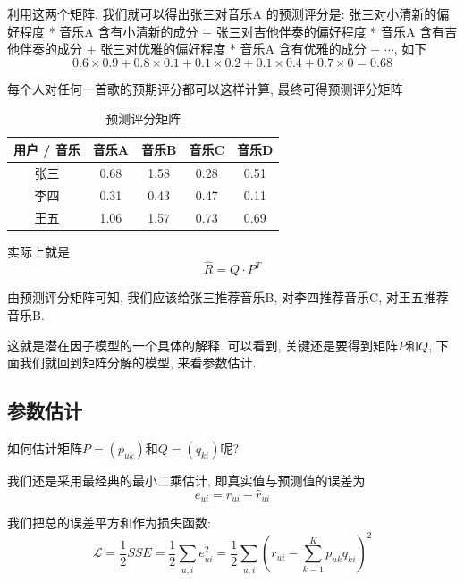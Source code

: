 \documentclass[a4paper,UTF8]{ctexart}
\theoremstyle{plain} \newtheorem{theorem}{定理}[section]
\theoremstyle{plain} \newtheorem{definition}{定义}[section]
\theoremstyle{plain} \newtheorem{lemma}{引理}[section]
\theoremstyle{plain} \newtheorem{proposition}{命题}[section]
\theoremstyle{plain} \newtheorem{example}{例}[section]
\theoremstyle{plain} \newtheorem{remark}{注}[section]
\theoremstyle{plain} \newtheorem{corollary}{推论}[section]
\begin{document}
利用这两个矩阵, 我们就可以得出张三对音乐A 的预测评分是: 张三对小清新的偏好程度 * 音乐A 含有小清新的成分 + 张三对吉他伴奏的偏好程度 * 音乐A 含有吉他伴奏的成分 + 张三对优雅的偏好程度 * 音乐A 含有优雅的成分 + $\cdots$, 如下
\begin{equation*}
0.6 \times 0.9 + 0.8 \times 0.1 + 0.1 \times 0.2 + 0.1 \times 0.4 + 0.7 \times 0 = 0.68
\end{equation*}

每个人对任何一首歌的预期评分都可以这样计算, 最终可得预测评分矩阵
\begin{table}[!htb]
\centering
\caption{预测评分矩阵}
\label{predmatrix}
\begin{tabular}{c|c|c|c|c}
  \hline
    \textbf{用户 / 音乐} & \textbf{音乐A} & \textbf{音乐B} & \textbf{音乐C} & \textbf{音乐D} \\
    \hline
    张三  & 0.68 & {\color{red} 1.58} & 0.28 & 0.51 \\
    \hline
    李四  & 0.31 & 0.43 & {\color{red} 0.47} & 0.11 \\
    \hline
    王五  & 1.06 & {\color{red} 1.57} & 0.73 & 0.69 \\
  \hline
\end{tabular}
\end{table}

实际上就是
\begin{equation*}
\hat{R} = Q \cdot P^{T}
\end{equation*}

由预测评分矩阵可知, 我们应该给张三推荐音乐B, 对李四推荐音乐C, 对王五推荐音乐B.

这就是潜在因子模型的一个具体的解释. 可以看到, 关键还是要得到矩阵$P$和$Q$, 下面我们就回到矩阵分解的模型, 来看参数估计.

\subsection{参数估计}
如何估计矩阵$P = (p_{uk})$和$Q = (q_{ki})$呢?

我们还是采用最经典的最小二乘估计, 即真实值与预测值的误差为
\begin{equation*}
e_{ui} = r_{ui} - \hat{r}_{ui}
\end{equation*}

我们把总的误差平方和作为损失函数:
\begin{equation*}
\mathcal{L} = \frac{1}{2} SSE = \frac{1}{2} \sum_{u,i} e_{ui}^2 = \frac{1}{2} \sum_{u,i} \left( r_{ui} - \sum_{k=1}^{K} p_{uk} q_{ki} \right)^2
\end{equation*}
\end{document}
